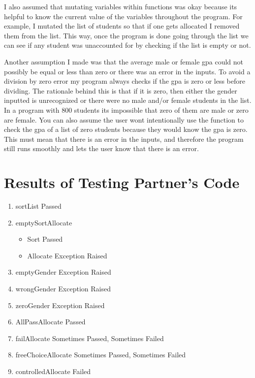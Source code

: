\documentclass[12pt]{article}
\begin{document}
\bigskip
I also assumed that mutating variables within functions was okay because its helpful to know the current value of the variables throughout the program. For example, I mutated the list of students so that if one gets allocated I removed them from the list. This way, once the program is done going through the list we can see if any student was unaccounted for by checking if the list is empty or not. 

\bigskip
Another assumption I made was that the average male or female gpa could not possibly be equal or less than zero or there was an error in the inputs. To avoid a division by zero error my program always checks if the gpa is zero or less before dividing. The rationale behind this is that if it is zero, then either the gender inputted is unrecognized or there were no male and/or female students in the list. In a program with 800 students its impossible that zero of them are male or zero are female. You can also assume the user wont intentionally use the function to check the gpa of a list of zero students because they would know the gpa is zero. This must mean that there is an error in the inputs, and therefore the program still runs smoothly and lets the user know that there is an error.



\section{Results of Testing Partner's Code}
\begin{enumerate}
   \item sortList Passed
   \item emptySortAllocate
   \begin{itemize}
     \item Sort Passed
     \item Allocate Exception Raised
   \end{itemize}
   \item emptyGender Exception Raised
   \item wrongGender Exception Raised
   \item zeroGender Exception Raised
   \item AllPassAllocate Passed
   \item failAllocate Sometimes Passed, Sometimes Failed
   \item freeChoiceAllocate Sometimes Passed, Sometimes Failed
   \item controlledAllocate Failed
\end{enumerate}
\end{document}
